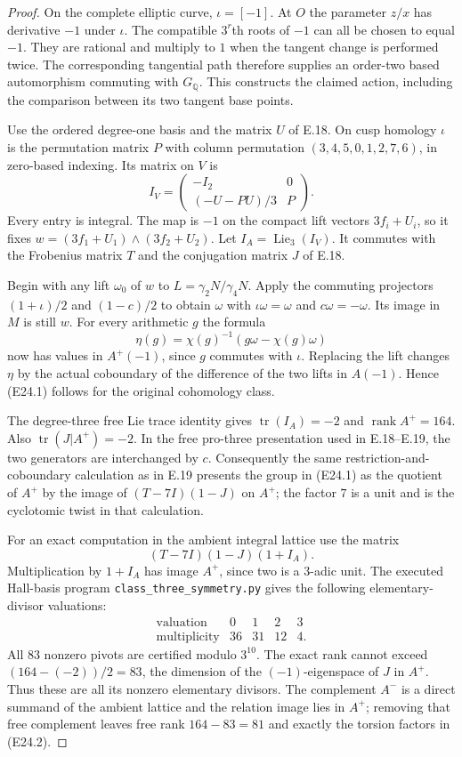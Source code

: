 \documentclass[11pt,oneside]{article}
\begin{document}
\begin{proof}
On the complete elliptic curve, $\iota=[-1]$.
At $O$ the parameter $z/x$ has derivative $-1$
under $\iota$. The compatible $3^r$th roots of $-1$
can all be chosen to equal $-1$. They are rational
and multiply to $1$ when the tangent change is
performed twice. The corresponding tangential
path therefore supplies an order-two based
automorphism commuting with $G_{\mathbb Q}$.
This constructs the claimed action, including the
comparison between its two tangent base points.

Use the ordered degree-one basis and the matrix $U$
of E.18. On cusp homology $\iota$ is the permutation
matrix $P$ with column permutation
$(3,4,5,0,1,2,7,6)$, in zero-based indexing. Its
matrix on $V$ is
\[
 I_V=\begin{pmatrix}
 -I_2&0\\(-U-PU)/3&P
 \end{pmatrix}.\tag{E24.3}
\]
Every entry is integral. The map is $-1$ on the
compact lift vectors $3f_i+U_i$, so it fixes
$w=(3f_1+U_1)\wedge(3f_2+U_2)$.
Let $I_A=\operatorname{Lie}_3(I_V)$.
It commutes with the Frobenius matrix $T$ and
the conjugation matrix $J$ of E.18.

Begin with any lift $\omega_0$ of $w$ to
$L=\gamma_2N/\gamma_4N$. Apply the commuting
projectors $(1+\iota)/2$ and $(1-c)/2$ to obtain
$\omega$ with $\iota\omega=\omega$ and
$c\omega=-\omega$. Its image in $M$ is still $w$.
For every arithmetic $g$ the formula
\[
 \eta(g)=\chi(g)^{-1}(g\omega-\chi(g)\omega)
\]
now has values in $A^+(-1)$, since $g$ commutes
with $\iota$. Replacing the lift changes $\eta$
by the actual coboundary of the difference of the
two lifts in $A(-1)$. Hence (E24.1) follows for
the original cohomology class.

The degree-three free Lie trace identity gives
$\operatorname{tr}(I_A)=-2$ and
$\operatorname{rank}A^+=164$. Also
$\operatorname{tr}(J|A^+)=-2$. In the free
pro-three presentation used in E.18--E.19, the
two generators are interchanged by $c$.
Consequently the same restriction-and-coboundary
calculation as in E.19 presents the group in
(E24.1) as the quotient of $A^+$ by the image of
$(T-7I)(1-J)$ on $A^+$; the factor $7$ is a unit
and is the cyclotomic twist in that calculation.

For an exact computation in the ambient integral
lattice use the matrix
\[
             (T-7I)(1-J)(1+I_A).
\]
Multiplication by $1+I_A$ has image $A^+$, since
two is a $3$-adic unit. The executed Hall-basis
program \texttt{class\_three\_symmetry.py} gives
the following elementary-divisor valuations:
\[
\begin{array}{c|rrrr}
\text{valuation}&0&1&2&3\\\hline
\text{multiplicity}&36&31&12&4.
\end{array}
\]
All 83 nonzero pivots are certified modulo $3^{10}$.
The exact rank cannot exceed
$(164-(-2))/2=83$, the dimension of the
$(-1)$-eigenspace of $J$ in $A^+$.
Thus these are all its nonzero elementary divisors.
The complement $A^-$ is a direct summand of the
ambient lattice and the relation image lies in
$A^+$; removing that free complement leaves
free rank $164-83=81$ and exactly the torsion
factors in (E24.2).


\end{proof}
\end{document}
